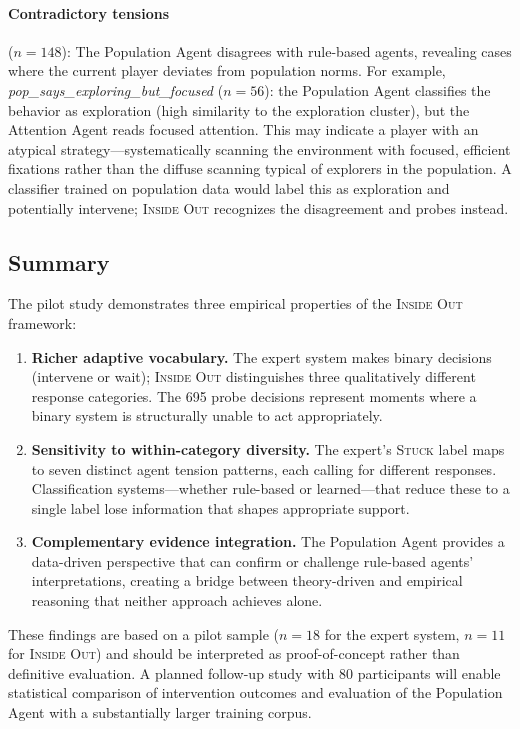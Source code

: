 \paragraph{Contradictory tensions} ($n = 148$): The Population Agent disagrees with rule-based agents, revealing cases where the current player deviates from population norms. For example, \emph{pop\_says\_exploring\_but\_focused} ($n = 56$): the Population Agent classifies the behavior as exploration (high similarity to the exploration cluster), but the Attention Agent reads focused attention. This may indicate a player with an atypical strategy---systematically scanning the environment with focused, efficient fixations rather than the diffuse scanning typical of explorers in the population. A classifier trained on population data would label this as exploration and potentially intervene; \textsc{Inside Out} recognizes the disagreement and probes instead.

\subsection{Summary}

The pilot study demonstrates three empirical properties of the \textsc{Inside Out} framework:

\begin{enumerate}
    \item \textbf{Richer adaptive vocabulary.} The expert system makes binary decisions (intervene or wait); \textsc{Inside Out} distinguishes three qualitatively different response categories. The 695 probe decisions represent moments where a binary system is structurally unable to act appropriately.

    \item \textbf{Sensitivity to within-category diversity.} The expert's \textsc{Stuck} label maps to seven distinct agent tension patterns, each calling for different responses. Classification systems---whether rule-based or learned---that reduce these to a single label lose information that shapes appropriate support.

    \item \textbf{Complementary evidence integration.} The Population Agent provides a data-driven perspective that can confirm or challenge rule-based agents' interpretations, creating a bridge between theory-driven and empirical reasoning that neither approach achieves alone.
\end{enumerate}

These findings are based on a pilot sample ($n = 18$ for the expert system, $n = 11$ for \textsc{Inside Out}) and should be interpreted as proof-of-concept rather than definitive evaluation. A planned follow-up study with 80 participants will enable statistical comparison of intervention outcomes and evaluation of the Population Agent with a substantially larger training corpus.

